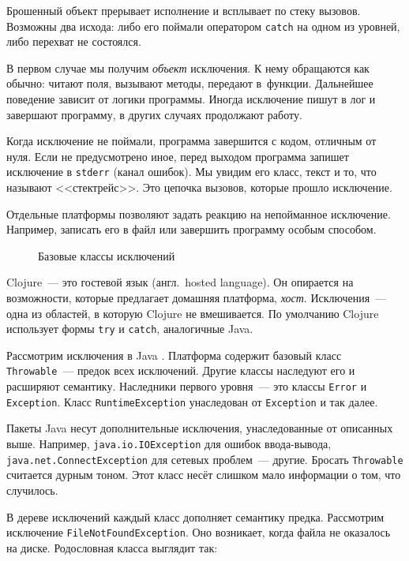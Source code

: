 Брошенный объект прерывает исполнение и всплывает по стеку вызовов. Возможны два
исхода: либо его поймали оператором \verb|catch| на одном из уровней, либо
перехват не состоялся.

В первом случае мы получим \emph{объект} исключения. К нему обращаются как
обычно: читают поля, вызывают методы, передают в~функции. Дальнейшее поведение
зависит от логики программы. Иногда исключение пишут в лог и завершают
программу, в других случаях продолжают работу.

Когда исключение не поймали, программа завершится с кодом, отличным от
нуля. Если не предусмотрено иное, перед выходом программа запишет исключение в
\verb|stderr| (канал ошибок). Мы увидим его класс, текст и то, что называют
<<стектрейс>>. Это цепочка вызовов, которые прошло исключение.


Отдельные платформы позволяют задать реакцию на непойманное
исключение. Например, записать его в файл или завершить программу особым
способом.

\begin{figure}[ht!]
  \caption{Базовые классы исключений}
  \label{fig:exceptions}
\end{figure}

Clojure~--- это гостевой язык (англ.~hosted language). Он опирается на возможности,
которые предлагает домашняя платформа, \emph{хост}. Исключения~--- одна из
областей, в которую Clojure не вмешивается. По умолчанию Clojure использует
формы \verb|try| и \verb|catch|, аналогичные Java.


Рассмотрим исключения в Java . Платформа содержит
базовый класс \verb|Throwable|~--- предок всех исключений. Другие классы наследуют
его и расширяют семантику. Наследники первого уровня~--- это классы \verb|Error| и
\verb|Exception|. Класс \verb|RuntimeException| унаследован от \verb|Exception|
и так далее.


Пакеты Java несут дополнительные исключения, унаследованные от описанных
выше. Например, \verb|java.io.IOException| для ошибок ввода-вывода,
\verb|java.net.ConnectException| для сетевых проблем~--- другие. Бросать
\verb|Throwable| считается дурным тоном. Этот класс несёт слишком мало
информации о том, что случилось.

В дереве исключений каждый класс дополняет семантику предка. Рассмотрим
исключение \verb|FileNotFoundException|. Оно возникает, когда файла не
оказалось на диске. Родословная класса выглядит так:

